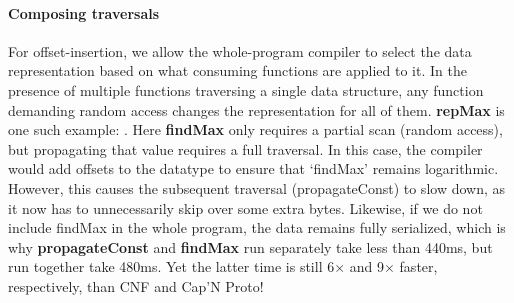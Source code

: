 \paragraph{Composing traversals}

For offset-insertion, we allow the whole-program compiler to select the data
representation based on what consuming functions are applied to it.
In the presence of multiple functions traversing a single data structure,
any function demanding random access changes the representation for all of them.
{\bf repMax} is one such example:
.
Here {\bf findMax} only requires a partial scan (random access), but propagating
that value requires a full traversal.  In this case, the compiler would add
offsets to the datatype to ensure that `findMax' remains
logarithmic.
%
However, this causes the subsequent traversal (propagateConst) to slow
down, as it now has to unnecessarily skip over some extra bytes.  Likewise, if
we do not include findMax in the whole program, the data remains fully
serialized, which is why {\bf propagateConst} and {\bf findMax} run separately
take less than 440ms, but run together take 480ms.  Yet the latter time is still
6$\times$ and 9$\times$ faster, respectively, than CNF and Cap'N Proto!



